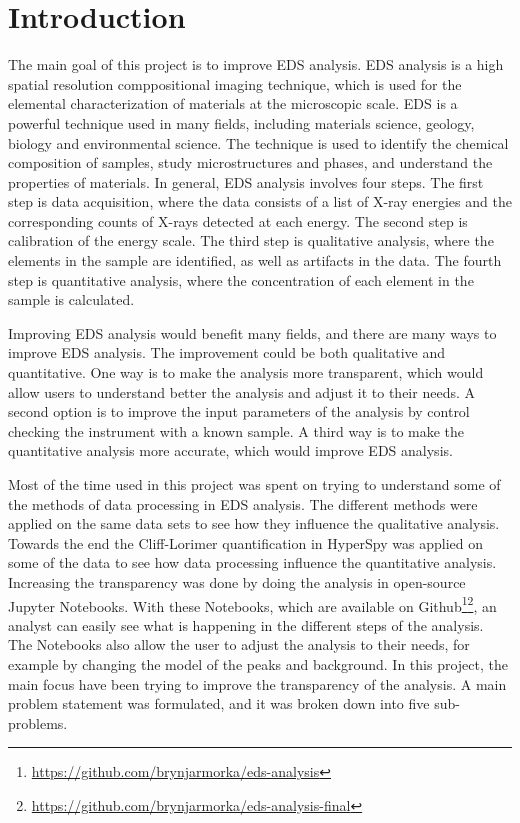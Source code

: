 \chapter{Introduction}
\label{chap:introduction}




The main goal of this project is to improve EDS analysis.
EDS analysis is a high spatial resolution comppositional imaging technique, which is used for the elemental characterization of materials at the microscopic scale.
EDS is a powerful technique used in many fields, including materials science, geology, biology and environmental science.
The technique is used to identify the chemical composition of samples, study microstructures and phases, and understand the properties of materials.
In general, EDS analysis involves four steps.
The first step is data acquisition, where the data consists of a list of X-ray energies and the corresponding counts of X-rays detected at each energy.
The second step is calibration of the energy scale.
The third step is qualitative analysis, where the elements in the sample are identified, as well as artifacts in the data.
The fourth step is quantitative analysis, where the concentration of each element in the sample is calculated.



Improving EDS analysis would benefit many fields, and there are many ways to improve EDS analysis.
The improvement could be both qualitative and quantitative.
One way is to make the analysis more transparent, which would allow users to understand better the analysis and adjust it to their needs.
A second option is to improve the input parameters of the analysis by control checking the instrument with a known sample.
A third way is to make the quantitative analysis more accurate, which would improve EDS analysis.

Most of the time used in this project was spent on trying to understand some of the methods of data processing in EDS analysis.
The different methods were applied on the same data sets to see how they influence the qualitative analysis.
Towards the end the Cliff-Lorimer quantification in HyperSpy was applied on some of the data to see how data processing influence the quantitative analysis.
Increasing the transparency was done by doing the analysis in open-source Jupyter Notebooks.
With these Notebooks, which are available on Github\footnote{\url{https://github.com/brynjarmorka/eds-analysis}}\footnote{\url{https://github.com/brynjarmorka/eds-analysis-final}}, an analyst can easily see what is happening in the different steps of the analysis.
The Notebooks also allow the user to adjust the analysis to their needs, for example by changing the model of the peaks and background.
In this project, the main focus have been trying to improve the transparency of the analysis.
A main problem statement was formulated, and it was broken down into five sub-problems.


